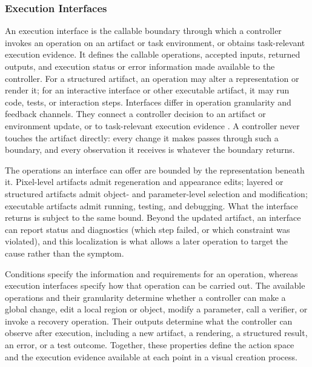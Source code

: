\subsubsection{Execution Interfaces}

An execution interface is the callable boundary through which a controller invokes an operation on an artifact or task environment, or obtains task-relevant execution evidence. It defines the callable operations, accepted inputs, returned outputs, and execution status or error information made available to the controller. For a structured artifact, an operation may alter a representation or render it; for an interactive interface or other executable artifact, it may run code, tests, or interaction steps. Interfaces differ in operation granularity and feedback channels. They connect a controller decision to an artifact or environment update, or to task-relevant execution evidence \cite{he2024llms,yin2025spatiotemporal}. A controller never touches the artifact directly: every change it makes passes through such a boundary, and every observation it receives is whatever the boundary returns.

The operations an interface can offer are bounded by the representation beneath it. Pixel-level artifacts admit regeneration and appearance edits; layered or structured artifacts admit object- and parameter-level selection and modification; executable artifacts admit running, testing, and debugging. What the interface returns is subject to the same bound. Beyond the updated artifact, an interface can report status and diagnostics (which step failed, or which constraint was violated), and this localization is what allows a later operation to target the cause rather than the symptom.

Conditions specify the information and requirements for an operation, whereas execution interfaces specify how that operation can be carried out. The available operations and their granularity determine whether a controller can make a global change, edit a local region or object, modify a parameter, call a verifier, or invoke a recovery operation. Their outputs determine what the controller can observe after execution, including a new artifact, a rendering, a structured result, an error, or a test outcome. Together, these properties define the action space and the execution evidence available at each point in a visual creation process.

